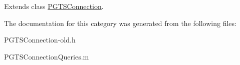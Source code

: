 Extends class \hyperlink{interface_p_g_t_s_connection_a4376dcad5b13ea495f9237a26453642f}{P\+G\+T\+S\+Connection}.



The documentation for this category was generated from the following files\+:\begin{DoxyCompactItemize}
\item 
P\+G\+T\+S\+Connection-\/old.\+h\item 
P\+G\+T\+S\+Connection\+Queries.\+m\end{DoxyCompactItemize}
